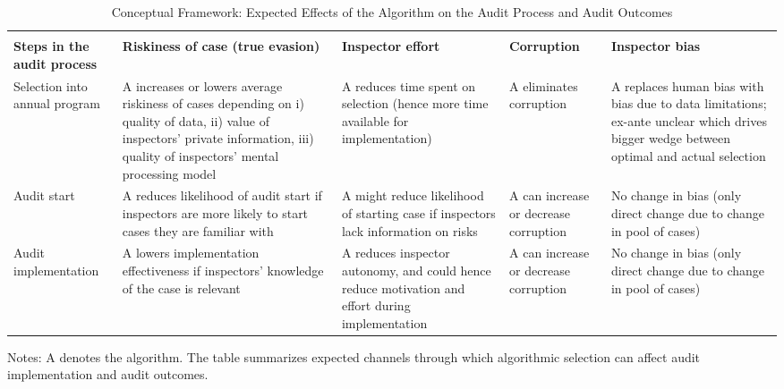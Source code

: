 \begin{table}[H]
\centering
\begin{adjustbox}{max width=\textwidth}
\begin{threeparttable}
\caption{Conceptual Framework: Expected Effects of the Algorithm on the Audit Process and Audit Outcomes}
\label{tab:senegal_conceptual_framework}
\footnotesize
\renewcommand{\arraystretch}{1.25}
\begin{tabular}{
    >{\raggedright\arraybackslash}p{2.4cm}
    >{\raggedright\arraybackslash}p{3.2cm}
    >{\raggedright\arraybackslash}p{3.2cm}
    >{\raggedright\arraybackslash}p{2.8cm}
    >{\raggedright\arraybackslash}p{3.4cm}
}
\toprule
& \multicolumn{4}{c}{\textbf{Determinants of audit outcome / success / yield}} \\
\cmidrule(lr){2-5}
\textbf{Steps in the audit process} &
\textbf{Riskiness of case (true evasion)} &
\textbf{Inspector effort} &
\textbf{Corruption} &
\textbf{Inspector bias} \\
\midrule
Selection into annual program &
A increases or lowers average riskiness of cases depending on i) quality of data, ii) value of inspectors' private information, iii) quality of inspectors' mental processing model &
A reduces time spent on selection (hence more time available for implementation) &
A eliminates corruption &
A replaces human bias with bias due to data limitations; ex-ante unclear which drives bigger wedge between optimal and actual selection \\
\addlinespace
Audit start &
A reduces likelihood of audit start if inspectors are more likely to start cases they are familiar with &
A might reduce likelihood of starting case if inspectors lack information on risks &
A can increase or decrease corruption &
No change in bias (only direct change due to change in pool of cases) \\
\addlinespace
Audit implementation &
A lowers implementation effectiveness if inspectors' knowledge of the case is relevant &
A reduces inspector autonomy, and could hence reduce motivation and effort during implementation &
A can increase or decrease corruption &
No change in bias (only direct change due to change in pool of cases) \\
\bottomrule
\end{tabular}
\begin{tablenotes}[flushleft]
\footnotesize
\item Notes: A denotes the algorithm. The table summarizes expected channels through which algorithmic selection can affect audit implementation and audit outcomes.
\end{tablenotes}
\end{threeparttable}
\end{adjustbox}
\end{table}

